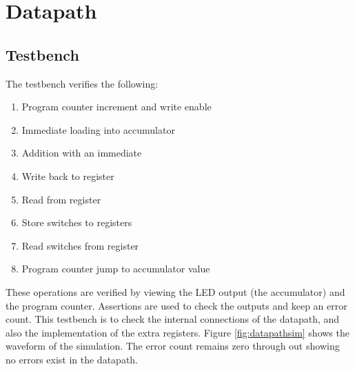 


\section{Datapath}\label{sect:datapath}
\subsection{Testbench}
The testbench verifies the following: %
\begin{enumerate}
\item Program counter increment and write enable
\item Immediate loading into accumulator
\item Addition with an immediate
\item Write back to register
\item Read from register
\item Store switches to registers
\item Read switches from register
\item Program counter jump to accumulator value
\end{enumerate}

These operations are verified by viewing the LED output (the accumulator) and the program counter.
Assertions are used to check the outputs and keep an error count. 
This testbench is to check the internal connections of the datapath, and also the implementation of the extra registers.
Figure \ref{fig:datapathsim} shows the waveform of the simulation. 
The error count remains zero through out showing no errors exist in the datapath.

